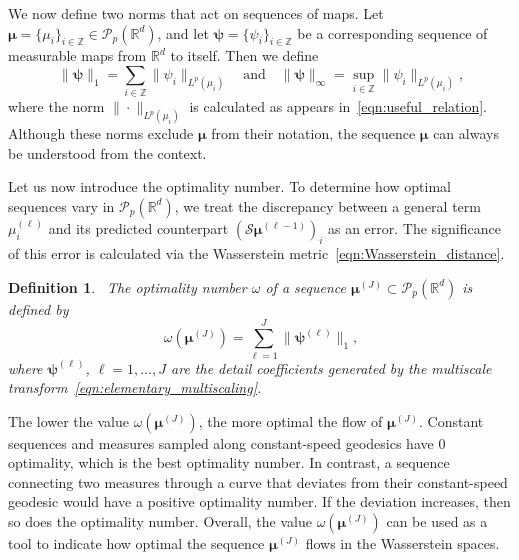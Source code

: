 \documentclass[12pt]{amsart}
\newtheorem{defin}{Definition}[section]
\begin{document}
We now define two norms that act on sequences of maps. Let $\boldsymbol{\mu}=\{\mu_i\}_{i\in\mathbb{Z}}\in\mathcal{P}_p(\mathbb{R}^d)$, and let $\boldsymbol{\psi}=\{\psi_i\}_{i\in\mathbb{Z}}$ be a corresponding sequence of measurable maps from $\mathbb{R}^d$ to itself. Then we define
\begin{equation}~\label{eqn:useful_norms}
    \|\boldsymbol{\psi}\|_{1} = \sum_{i\in\mathbb{Z}} \|\psi_i\|_{L^p(\mu_i)} \quad \text{and} \quad \|\boldsymbol{\psi}\|_{\infty} = \sup_{i\in\mathbb{Z}} \|\psi_i\|_{L^p(\mu_i)},
\end{equation}
where the norm $\|\cdot\|_{L^p(\mu_i)}$ is calculated as appears in~\eqref{eqn:useful_relation}. Although these norms exclude $\boldsymbol{\mu}$ from their notation, the sequence $\boldsymbol{\mu}$ can always be understood from the context.

Let us now introduce the optimality number. To determine how optimal sequences vary in $\mathcal{P}_p(\mathbb{R}^d)$, we treat the discrepancy between a general term $\mu_i^{(\ell)}$ and its predicted counterpart $(\mathcal{S}\boldsymbol{\mu}^{(\ell-1)})_{i}$ as an error. The significance of this error is calculated via the Wasserstein metric~\eqref{eqn:Wasserstein_distance}.

\begin{defin}~\label{defin:optimality_number}
    The optimality number $\omega$ of a sequence $\boldsymbol{\mu}^{(J)}\subset\mathcal{P}_p(\mathbb{R}^d)$ is defined by
    \begin{equation}~\label{eqn:optimality_number}
        \omega(\boldsymbol{\mu}^{(J)}) = \sum_{\ell=1}^J \|\boldsymbol{\psi}^{(\ell)}\|_{1},
    \end{equation}
    where $\boldsymbol{\psi}^{(\ell)}$, $\ell=1,\dots, J$ are the detail coefficients generated by the multiscale transform~\eqref{eqn:elementary_multiscaling}.
\end{defin}

The lower the value $\omega(\boldsymbol{\mu}^{(J)})$, the more optimal the flow of $\boldsymbol{\mu}^{(J)}$. Constant sequences and measures sampled along constant-speed geodesics have $0$ optimality, which is the best optimality number. In contrast, a sequence connecting two measures through a curve that deviates from their constant-speed geodesic would have a positive optimality number. If the deviation increases, then so does the optimality number. Overall, the value $\omega(\boldsymbol{\mu}^{(J)})$ can be used as a tool to indicate how optimal the sequence $\boldsymbol{\mu}^{(J)}$ flows in the Wasserstein spaces.
\end{document}
